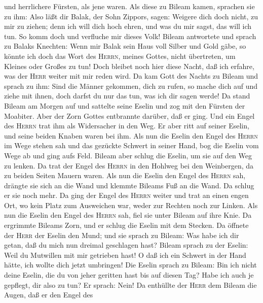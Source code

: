 und herrlichere Fürsten, als jene waren.  Als diese zu
Bileam kamen, sprachen sie zu ihm: Also läßt dir Balak, der Sohn
Zippors, sagen: Weigere dich doch nicht, zu mir zu ziehen;
 denn ich will dich hoch ehren, und was du mir sagst, das
will ich tun. So komm doch und verfluche mir dieses Volk!
 Bileam antwortete und sprach zu Balaks Knechten: Wenn
mir Balak sein Haus voll Silber und Gold gäbe, so könnte ich doch das
Wort des \textsc{Herrn}, meines Gottes, nicht übertreten, um Kleines
oder Großes zu tun!  Doch bleibet noch hier diese Nacht,
daß ich erfahre, was der \textsc{Herr} weiter mit mir reden wird.
 Da kam Gott des Nachts zu Bileam und sprach zu ihm: Sind
die Männer gekommen, dich zu rufen, so mache dich auf und ziehe mit
ihnen, doch darfst du nur das tun, was ich dir sagen werde!
 Da stand Bileam am Morgen auf und sattelte seine Eselin
und zog mit den Fürsten der Moabiter.  Aber der Zorn
Gottes entbrannte darüber, daß er ging. Und ein Engel des \textsc{Herrn}
trat ihm als Widersacher in den Weg. Er aber ritt auf seiner Eselin, und
seine beiden Knaben waren bei ihm.  Als nun die Eselin
den Engel des \textsc{Herrn} im Wege stehen sah und das gezückte Schwert
in seiner Hand, bog die Eselin vom Wege ab und ging aufs Feld. Bileam
aber schlug die Eselin, um sie auf den Weg zu lenken.  Da
trat der Engel des \textsc{Herrn} in den Hohlweg bei den Weinbergen, da
zu beiden Seiten Mauern waren.  Als nun die Eselin den
Engel des \textsc{Herrn} sah, drängte sie sich an die Wand und klemmte
Bileams Fuß an die Wand. Da schlug er sie noch mehr.  Da
ging der Engel des \textsc{Herrn} weiter und trat an einen engen Ort, wo
kein Platz zum Ausweichen war, weder zur Rechten noch zur Linken.
 Als nun die Eselin den Engel des \textsc{Herrn} sah,
fiel sie unter Bileam auf ihre Knie. Da ergrimmte Bileams Zorn, und er
schlug die Eselin mit dem Stecken.  Da öffnete der
\textsc{Herr} der Eselin den Mund; und sie sprach zu Bileam: Was habe
ich dir getan, daß du mich nun dreimal geschlagen hast? 
Bileam sprach zu der Eselin: Weil du Mutwillen mit mir getrieben hast! O
daß ich ein Schwert in der Hand hätte, ich wollte dich jetzt umbringen!
 Die Eselin sprach zu Bileam: Bin ich nicht deine Eselin,
die du von jeher geritten hast bis auf diesen Tag? Habe ich auch je
gepflegt, dir also zu tun?  Er sprach: Nein! Da enthüllte
der \textsc{Herr} dem Bileam die Augen, daß er den Engel des
